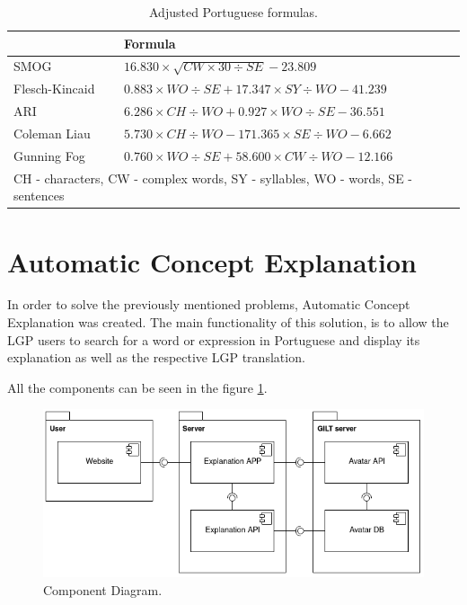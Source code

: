 \documentclass[runningheads]{llncs}
\begin{document}
\begin{table}
    \caption{Adjusted Portuguese formulas.}
    \label{table:ptformulas}
    \begin{tabular}{l|l}
        \hline
        {} & {\bfseries Formula} \\
        \hline
        SMOG & \(16.830 \times \sqrt{CW \times 30 \div SE} - 23.809\)  \\
        \hline
        Flesch-Kincaid & \(0.883 \times WO \div SE + 17.347 \times SY \div WO - 41.239\) \\
        \hline
        ARI & \(6.286 \times CH \div WO + 0.927 \times WO \div SE - 36.551\) \\
        \hline
        Coleman Liau & \(5.730 \times CH \div WO - 171.365 \times SE \div WO - 6.662\) \\
        \hline
        Gunning Fog & \(0.760 \times WO \div SE + 58.600 \times CW \div WO - 12.166\) \\
        \hline
        \multicolumn{2}{l}{CH - characters, CW - complex words, SY - syllables, WO - words, SE - sentences}
    \end{tabular}
\end{table}

\section{Automatic Concept Explanation}

In order to solve the previously mentioned problems, Automatic Concept Explanation was created.
The main functionality of this solution, is to allow the LGP users to search for a word or expression in Portuguese and display its explanation as well as the respective LGP translation.

All the components can be seen in the figure \ref{fig1}.

\begin{figure}[ht]
\centering
\includegraphics[scale=0.4]{component_diagram.png}
\caption{Component Diagram.} \label{fig1}
\end{figure}
\end{document}

